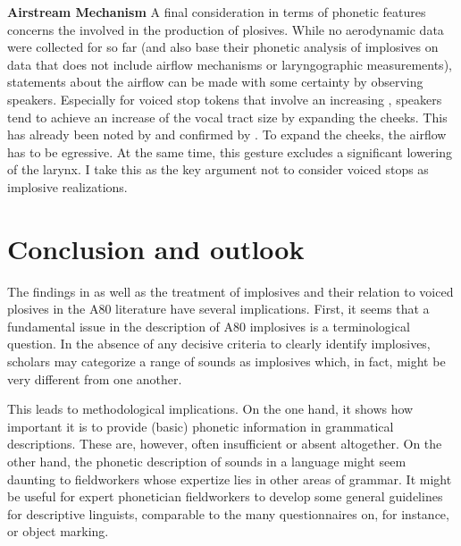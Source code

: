 \documentclass[output=paper]{LSP/langsci}
\begin{document}
{\bf Airstream Mechanism} A final consideration in terms of phonetic features concerns the  involved in the production of plosives. While no aerodynamic data were collected for  so far (and also \citet{Nagano2012} base their phonetic analysis of  implosives on data that does not include airflow mechanisms or laryngographic measurements), statements about the airflow can be made with some certainty by observing speakers. Especially for voiced stop tokens that involve an increasing ,  speakers tend to achieve an increase of the vocal tract size by expanding the cheeks. This has already been noted by \citet{Renaud1976} and confirmed by \citet{Grimm2015}. To expand the cheeks, the airflow has to be egressive. At the same time, this gesture excludes a significant lowering of the larynx. I take this as the key argument not to consider  voiced stops as implosive realizations.








\section{Conclusion and outlook}
\label{sec:grimm:4}

The findings in  as well as the treatment of implosives and their relation to voiced plosives in the A80 literature have several implications. First, it seems that a fundamental issue in the description of A80 implosives is a terminological question. In the absence of any decisive criteria to clearly identify implosives, scholars may categorize a range of sounds as implosives which, in fact, might be very different from one another. 

This leads to methodological implications. On the one hand, it shows how important it is to provide (basic) phonetic information in grammatical descriptions. These are, however, often insufficient or absent altogether. On the other hand, the phonetic description of sounds in a language might seem daunting to fieldworkers whose expertize lies in other areas of grammar. It might be useful for expert phonetician fieldworkers to develop some general guidelines for descriptive linguists, comparable to the many questionnaires on, for instance,  or object marking.
\end{document}

